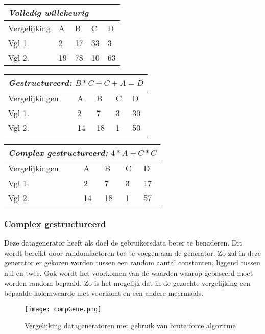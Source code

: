\documentclass[Main.tex]{subfiles}
\begin{document}
\begin{center}
\begin{tabular}{@{} *5l @{}}    \toprule
\multicolumn{5}{l}{\emph{Volledig willekeurig}}\\\midrule
 Vergelijking & A  & B  & C  & D  \\ 
 Vgl 1. & 2 & 17 & 33 & 3\\ 
 Vgl 2. & 19 & 78 & 10 & 63\\\bottomrule
 \hline
\end{tabular}

\begin{tabular}{@{} *5l @{}}    \toprule
\multicolumn{5}{l}{\emph{Gestructureerd: } $B*C+C+A = D$} \\ \midrule
 Vergelijkingen & A  & B  & C  & D  \\ 
 Vgl 1. & 2 & 7 & 3 & 30\\ 
 Vgl 2. & 14 & 18 & 1 & 50\\\bottomrule
 \hline
\end{tabular}

\begin{tabular}{@{} *5l @{}}    \toprule
\multicolumn{5}{l}{\emph{Complex gestructureerd:}  $4*A+C*C$}\\\midrule
 Vergelijkingen & A  & B  & C  & D  \\ 
 Vgl 1. & 2 & 7 & 3 & 17\\ 
 Vgl 2. & 14 & 18 & 1 & 57\\\bottomrule
 \hline
\end{tabular}
\end{center}

\subsubsection*{Complex gestructureerd}
Deze datagenerator heeft als doel de gebruikersdata beter te benaderen. Dit wordt bereikt door randomfactoren toe te voegen aan de generator. Zo zal in deze generator er gekozen worden tussen een random aantal constanten, liggend tussen nul en twee. Ook wordt het voorkomen van de waarden waarop gebaseerd moet worden random bepaald. Zo is het mogelijk dat in de gezochte vergelijking een bepaalde kolomwaarde niet voorkomt en een andere meermaals.

\begin{figure}
\centering
\texttt{[image: compGene.png]}
\caption{Vergelijking datageneratoren met gebruik van brute force algoritme} \label{fig:datageneratoren}
\end{figure}
\end{document}
